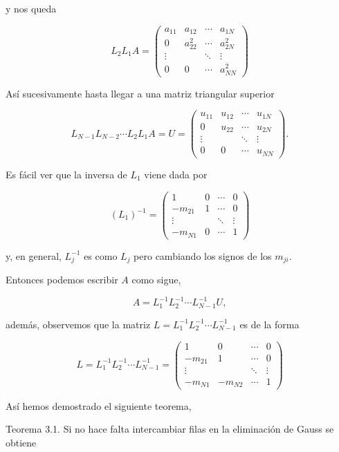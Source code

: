 \documentclass[10pt]{book}
\begin{document}
y nos queda

$$
L_{2} L_{1} A=\left(\begin{array}{cccc}
a_{11} & a_{12} & \cdots & a_{1 N} \\
0 & a_{22}^{2} & \cdots & a_{2 N}^{2} \\
\vdots & & \ddots & \vdots \\
0 & 0 & \cdots & a_{N N}^{2}
\end{array}\right)
$$

Así sucesivamente hasta llegar a una matriz triangular superior

$$
L_{N-1} L_{N-2} \cdots L_{2} L_{1} A=U=\left(\begin{array}{cccc}
u_{11} & u_{12} & \cdots & u_{1 N} \\
0 & u_{22} & \cdots & u_{2 N} \\
\vdots & & \ddots & \vdots \\
0 & 0 & \cdots & u_{N N}
\end{array}\right) .
$$

Es fácil ver que la inversa de $L_{1}$ viene dada por

$$
\left(L_{1}\right)^{-1}=\left(\begin{array}{cccc}
1 & 0 & \cdots & 0 \\
-m_{21} & 1 & \cdots & 0 \\
\vdots & & \ddots & \vdots \\
-m_{N 1} & 0 & \cdots & 1
\end{array}\right)
$$

y, en general, $L_{j}^{-1}$ es como $L_{j}$ pero cambiando los signos de los $m_{j i}$.

Entonces podemos escribir $A$ como sigue,

$$
A=L_{1}^{-1} L_{2}^{-1} \cdots L_{N-1}^{-1} U,
$$

además, observemos que la matriz $L=L_{1}^{-1} L_{2}^{-1} \cdots L_{N-1}^{-1}$ es de la forma

$$
L=L_{1}^{-1} L_{2}^{-1} \cdots L_{N-1}^{-1}=\left(\begin{array}{cccc}
1 & 0 & \cdots & 0 \\
-m_{21} & 1 & \cdots & 0 \\
\vdots & & \ddots & \vdots \\
-m_{N 1} & -m_{N 2} & \cdots & 1
\end{array}\right)
$$

Así hemos demostrado el siguiente teorema,

Teorema 3.1. Si no hace falta intercambiar filas en la eliminación de Gauss se obtiene
\end{document}
